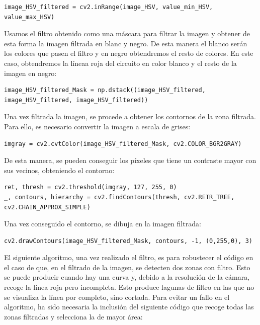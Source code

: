 \lstset{language=Python, breaklines=true, basicstyle=\footnotesize}
\begin{lstlisting}[frame=single]
image_HSV_filtered = cv2.inRange(image_HSV, value_min_HSV, value_max_HSV)
\end{lstlisting}

Usamos el filtro obtenido como una máscara para filtrar la imagen y obtener de esta forma la imagen filtrada en blanc y negro. De esta manera el blanco serán los colores que pasen el filtro y en negro obtendremos el resto de colores. En este caso, obtendremos la líneaa roja del circuito en color blanco y el resto de la imagen en negro:

\lstset{language=Python, breaklines=true, basicstyle=\footnotesize}
\begin{lstlisting}[frame=single]
image_HSV_filtered_Mask = np.dstack((image_HSV_filtered, image_HSV_filtered, image_HSV_filtered))
\end{lstlisting}

Una vez filtrada la imagen, se procede a obtener los contornos de la zona filtrada. Para ello, es necesario convertir la imagen a escala de grises:

\lstset{language=Python, breaklines=true, basicstyle=\footnotesize}
\begin{lstlisting}[frame=single]
imgray = cv2.cvtColor(image_HSV_filtered_Mask, cv2.COLOR_BGR2GRAY)
\end{lstlisting}

De esta manera, se pueden conseguir los píxeles que tiene un contraste mayor con sus vecinos, obteniendo el contorno:

\lstset{language=Python, breaklines=true, basicstyle=\footnotesize}
\begin{lstlisting}[frame=single]
ret, thresh = cv2.threshold(imgray, 127, 255, 0)
_, contours, hierarchy = cv2.findContours(thresh, cv2.RETR_TREE, cv2.CHAIN_APPROX_SIMPLE)
\end{lstlisting}

Una vez conseguido el contorno, se dibuja en la imagen filtrada:

\lstset{language=Python, breaklines=true, basicstyle=\footnotesize}
\begin{lstlisting}[frame=single]
cv2.drawContours(image_HSV_filtered_Mask, contours, -1, (0,255,0), 3)
\end{lstlisting}

El siguiente algoritmo, una vez realizado el filtro, es para robustecer el código en el caso de que, en el filtrado de la imagen, se detecten dos zonas con filtro. Esto se puede producir cuando hay una curva y, debido a la resolución de la cámara, recoge la línea roja pero incompleta. Esto produce lagunas de filtro en las que no se visualiza la línea por completo, sino cortada. Para evitar un fallo en el algoritmo, ha sido necesaria la inclusión del siguiente código que recoge todas las zonas filtradas y selecciona la de mayor área:

